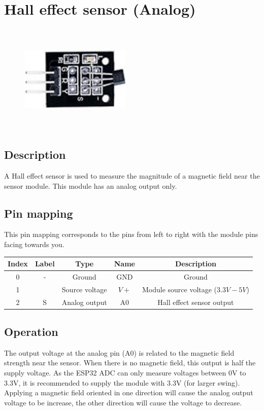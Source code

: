 \section{Hall effect sensor (Analog)}
\begin{figure}[H]
    \centering
    \includegraphics[angle=0, keepaspectratio=true, scale=1, width=200px, height=200px]{images/halleffect_analog.jpg}
\end{figure}
\subsection*{Description}
A Hall effect sensor is used to measure the magnitude of a magnetic field near the sensor module. This module has an analog output only.

\subsection*{Pin mapping}
This pin mapping corresponds to the pins from left to right with the module pins facing towards you.
\begin{table}[H]
    \centering
    \begin{tabular}{|c|c|c|c|c|}
    \hline
    Index &Label &Type &Name &Description\\ \hline
    0 &- &Ground &GND &Ground\\ \hline
    1 & &Source voltage &$V+$ &Module source voltage ($3.3V - 5V$)\\ \hline
    2 &S &Analog output &A0 &Hall effect sensor output\\ \hline
    \end{tabular}
\end{table}
\subsection*{Operation}
The output voltage at the analog pin (A0) is related to the magnetic field strength near the sensor. When there is no magnetic field, this output is half the supply voltage. As the ESP32 ADC can only measure voltages between 0V to 3.3V, it is recommended to supply the module with 3.3V (for larger swing). Applying a magnetic field oriented in one direction will cause the analog output voltage to be increase, the other direction will cause the voltage to decrease.
%
